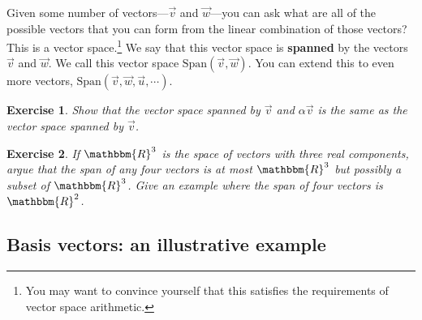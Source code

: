 \documentclass[12pt]{article}
\newtheorem{exercise}{Exercise}[section]
\begin{document}
Given some number of vectors---$\vec{v}$ and $\vec{w}$---you can ask what are all of the possible vectors that you can form from the linear combination of those vectors? This is a vector space.\footnote{You may want to convince yourself that this satisfies the requirements of vector space arithmetic.} We say that this vector space is \textbf{spanned} by the vectors $\vec{v}$ and $\vec{w}$. We call this vector space $\text{Span}(\vec{v},\vec{w})$. You can extend this to even more vectors, $\text{Span}(\vec{v}, \vec{w}, \vec{u},\cdots)$.

\begin{exercise}
Show that the vector space spanned by $\vec{v}$ and $\alpha\vec{v}$ is the same as the vector space spanned by $\vec{v}$.
\end{exercise}

\begin{exercise}
If $\mathbbm{R}^3$ is the space of vectors with three real components, argue that the span of any four vectors is at most $\mathbbm{R}^3$ but possibly a subset of $\mathbbm{R}^3$. Give an example where the span of four vectors is $\mathbbm{R}^2$. 
\end{exercise}

\subsection{Basis vectors: an illustrative example}
\end{document}
